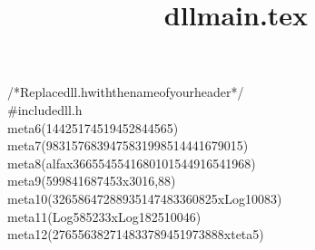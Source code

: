 \documentclass[a4paper, 10pt]{article}
\title{dllmain.tex}
\newcommand\SPC{\hspace*{0.6em}}
\newcommand\QOT{\mbox{\char 34}}
\newcommand{\CppAComment}[1]{\textcolor[rgb]{0,0.5,0}{#1}}
\newcommand{\CppAIdentifier}[1]{#1}
\newcommand{\CppANumber}[1]{#1}
\newcommand{\CppAPreprocessor}[1]{\textcolor[rgb]{0,0,1}{#1}}
\newcommand{\CppASpace}[1]{\colorbox[rgb]{1,1,1}{#1}}
\newcommand{\CppASymbol}[1]{#1}
\begin{document}
\begin{ttfamily}
\noindent
\CppAComment{/*\SPC Replace\SPC \QOT dll.h\QOT \SPC with\SPC the\SPC name\SPC of\SPC your\SPC header\SPC */}\\
\CppAPreprocessor{\#include\SPC \QOT dll.h\QOT }\\
\CppASpace{\SPC \SPC \SPC }\CppAIdentifier{meta6}\CppASpace{\SPC }\CppASymbol{(}\CppANumber{14425174519452844565}\CppASymbol{)}\\
\CppASpace{\SPC \SPC \SPC \SPC \SPC \SPC \SPC \SPC \SPC \SPC }\CppAIdentifier{meta7}\CppASpace{\SPC }\CppASymbol{(}\CppANumber{9831576839475831998514441679015}\CppASymbol{)}\\
\CppASpace{\SPC \SPC \SPC \SPC \SPC \SPC \SPC \SPC \SPC \SPC \SPC \SPC \SPC \SPC \SPC \SPC \SPC \SPC \SPC }\CppAIdentifier{meta8}\CppASpace{\SPC }\CppASymbol{(}\CppAIdentifier{alfa}\CppASpace{\SPC }\CppAIdentifier{x}\CppASpace{\SPC }\CppANumber{3665545541680101544916541968}\CppASymbol{)}\\
\CppASpace{\SPC \SPC \SPC \SPC \SPC \SPC \SPC \SPC \SPC \SPC \SPC \SPC \SPC \SPC \SPC \SPC \SPC \SPC \SPC \SPC \SPC \SPC \SPC \SPC \SPC \SPC }\CppAIdentifier{meta}\CppASpace{\SPC }\CppANumber{9}\CppASpace{\SPC }\CppASymbol{(}\CppANumber{599841687453}\CppASpace{\SPC }\CppAIdentifier{x}\CppASpace{\SPC }\CppANumber{3016}\CppASymbol{,}\CppANumber{88}\CppASymbol{)}\\
\CppASpace{\SPC \SPC \SPC \SPC \SPC \SPC \SPC \SPC \SPC \SPC \SPC \SPC \SPC \SPC \SPC \SPC \SPC \SPC \SPC \SPC \SPC \SPC \SPC \SPC \SPC \SPC \SPC \SPC \SPC \SPC \SPC \SPC \SPC \SPC \SPC }\CppAIdentifier{meta}\CppASpace{\SPC }\CppANumber{10}\CppASpace{\SPC }\CppASymbol{(}\CppANumber{32658647288935147483360825}\CppASpace{\SPC }\CppAIdentifier{x}\CppASpace{\SPC }\CppAIdentifier{Log10083}\CppASymbol{)}\\
\CppASpace{\SPC \SPC \SPC \SPC \SPC \SPC \SPC \SPC \SPC \SPC \SPC \SPC \SPC \SPC \SPC \SPC \SPC \SPC \SPC \SPC \SPC \SPC \SPC \SPC \SPC \SPC \SPC \SPC \SPC \SPC \SPC \SPC \SPC \SPC \SPC \SPC \SPC \SPC \SPC \SPC \SPC \SPC \SPC \SPC \SPC }\CppAIdentifier{meta}\CppASpace{\SPC }\CppANumber{11}\CppASpace{\SPC }\CppASymbol{(}\CppAIdentifier{Log}\CppASpace{\SPC }\CppANumber{585233}\CppASpace{\SPC }\CppAIdentifier{x}\CppASpace{\SPC }\CppAIdentifier{Log}\CppASpace{\SPC }\CppANumber{182510046}\CppASymbol{)}\\
\CppASpace{\SPC \SPC \SPC \SPC \SPC \SPC \SPC \SPC \SPC \SPC \SPC \SPC \SPC \SPC \SPC \SPC \SPC \SPC \SPC \SPC \SPC \SPC \SPC \SPC \SPC \SPC \SPC \SPC \SPC \SPC \SPC \SPC \SPC \SPC \SPC \SPC \SPC \SPC \SPC \SPC \SPC \SPC \SPC \SPC \SPC \SPC \SPC \SPC \SPC \SPC \SPC \SPC \SPC \SPC }\CppAIdentifier{meta}\CppASpace{\SPC }\CppANumber{12}\CppASpace{\SPC }\CppASymbol{(}\CppANumber{276556382714833789451973888}\CppASpace{\SPC }\CppAIdentifier{x}\CppASpace{\SPC }\CppAIdentifier{teta5}\CppASymbol{)}\\

\end{ttfamily}
\end{document}
